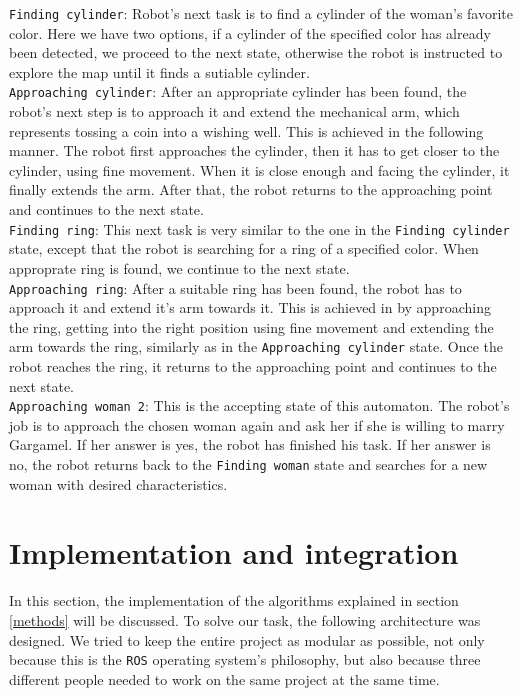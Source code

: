 \documentclass[12pt,a4paper]{article}
\begin{document}
	\texttt{Finding cylinder}: Robot's next task is to find a cylinder of the woman's favorite color. Here we have two options, if a cylinder of the specified color has already been detected, we proceed to the next state, otherwise the robot is instructed to explore the map until it finds a sutiable cylinder. \\

	\texttt{Approaching cylinder}: After an appropriate cylinder has been found, the robot's next step is to approach it and extend the mechanical arm, which represents tossing a coin into a wishing well. This is achieved in the following manner. The robot first approaches the cylinder, then it has to get closer to the cylinder, using fine movement. When it is close enough and facing the cylinder, it finally extends the arm. After that, the robot returns to the approaching point and continues to the next state. \\

	\texttt{Finding ring}: This next task is very similar to the one in the \texttt{Finding cylinder} state, except that the robot is searching for a ring of a specified color. When approprate ring is found, we continue to the next state. \\

	\texttt{Approaching ring}: After a suitable ring has been found, the robot has to approach it and extend it's arm towards it. This is achieved in by approaching the ring, getting into the right position using fine movement and extending the arm towards the ring, similarly as in the \texttt{Approaching cylinder} state. Once the robot reaches the ring, it returns to the approaching point and continues to the next state. \\

	\texttt{Approaching woman 2}: This is the accepting state of this automaton. The robot's job is to approach the chosen woman again and ask her if she is willing to marry Gargamel. If her answer is yes, the robot has finished his task. If her answer is no, the robot returns back to the \texttt{Finding woman} state and searches for a new woman with desired characteristics. \\
	
	\section{Implementation and integration}
	In this section, the implementation of the algorithms explained in section \ref{methods} will be discussed. To solve our task, the following architecture was designed. We tried to keep the entire project as modular as possible, not only because this is the \texttt{ROS} operating system's philosophy, but also because three different people needed to work on the same project at the same time. \\ %
	
\end{document}
